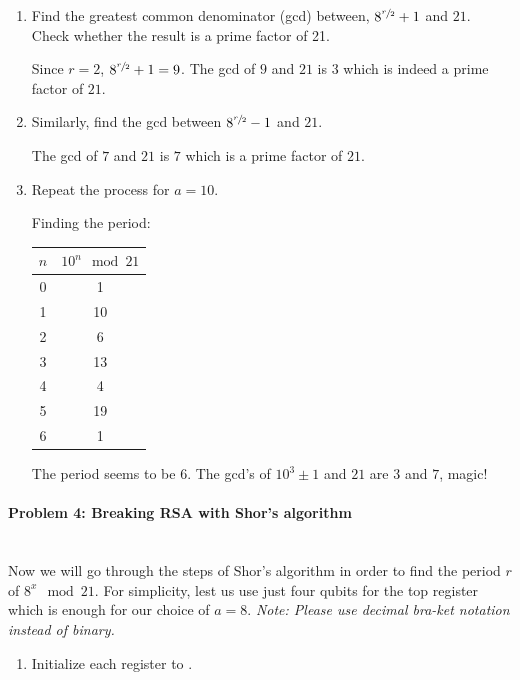 \documentclass[12pt]{article}
\newenvironment{answer}{\begingroup\setlength{\leftskip}{-\leftmargin}\begin{framed}}{\end{framed}\endgroup}
\begin{document}
\begin{enumerate}
    \item Find the greatest common denominator (gcd) between, $8^{\sfrac{r}{2}} + 1$ and $21$. Check whether the result is a prime factor of 21.

    \begin{answer}
        Since $r = 2$, $8^{\sfrac{r}{2}} + 1 = 9$. The gcd of $9$ and $21$ is $3$ which is indeed a prime factor of $21$.
    \end{answer}

    \item Similarly, find the gcd between $8^{\sfrac{r}{2}} - 1$ and $21$.

    \begin{answer}
        The gcd of $7$ and $21$ is $7$ which is a prime factor of $21$.
    \end{answer}

    \item Repeat the process for $a = 10$.

    \begin{answer}
        Finding the period:
        \begin{tabular}{c|c}
            $n$ & $10^n \mod 21$ \\
            \hline
            0 & 1 \\
            1 & 10 \\
            2 & 6 \\
            3 & 13 \\
            4 & 4 \\
            5 & 19 \\
            6 & 1 \\
        \end{tabular}
        The period seems to be $6$.
        The gcd's of $10^3 \pm 1$ and $21$ are $3$ and $7$, magic!
    \end{answer}
\end{enumerate}

\paragraph{Problem 4: Breaking RSA with Shor's algorithm} \hfill \\

Now we will go through the steps of Shor's algorithm in order to find the period $r$ of $8^x\mod21$. For simplicity, lest us use just four qubits for the top register which is enough for our choice of $a = 8$.
\emph{Note: Please use decimal bra-ket notation instead of binary. }

\begin{enumerate}
    \item Initialize each register to .
\end{enumerate}
\end{document}
